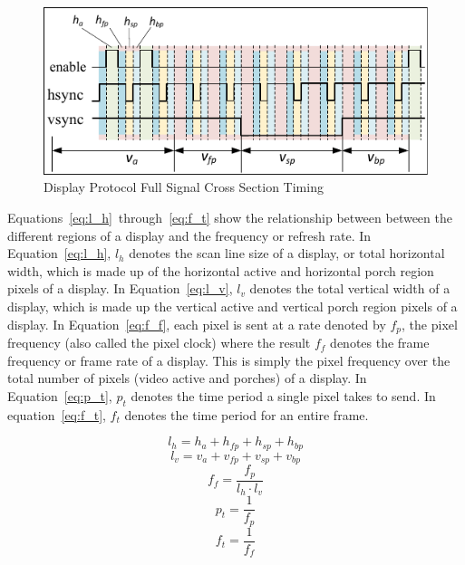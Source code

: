     \begin{figure}[H]
        \centering
        \includegraphics[width=1.0\textwidth]{fig/display_timing_full_cross.pdf}
        \caption{Display Protocol Full Signal Cross Section Timing}
        \label{fig:display_protocol_full_cross}
    \end{figure}

    Equations~\eqref{eq:l_h}~through~\eqref{eq:f_t} show the relationship between between the different regions of a display and the frequency or refresh rate. In Equation~\eqref{eq:l_h}, $l_h$ denotes the scan line size of a display, or total horizontal width, which is made up of the horizontal active and horizontal porch region pixels of a display. In Equation~\eqref{eq:l_v}, $l_v$ denotes the total vertical width of a display, which is made up the vertical active and vertical porch region pixels of a display. In Equation~\eqref{eq:f_f}, each pixel is sent at a rate denoted by $f_p$, the pixel frequency (also called the pixel clock) where the result $f_f$ denotes the frame frequency or frame rate of a display. This is simply the pixel frequency over the total number of pixels (video active and porches) of a display. In Equation~\eqref{eq:p_t}, $p_t$ denotes the time period a single pixel takes to send. In equation~\eqref{eq:f_t}, $f_t$ denotes the time period for an entire frame.


    \begin{equation}
        l_h=h_a+h_{fp}+h_{sp}+h_{bp}
        \label{eq:l_h}
    \end{equation}
    \begin{equation}
        l_v=v_a+v_{fp}+v_{sp}+v_{bp}
        \label{eq:l_v}
    \end{equation}
    \begin{equation}
        f_f={\frac{f_p}{l_h \cdot l_v}}
        \label{eq:f_f}
    \end{equation}
    \begin{equation}
        p_t={\frac{1}{f_p}}
        \label{eq:p_t}
    \end{equation}
    \begin{equation}
        f_t={\frac{1}{f_f}}
        \label{eq:f_t}
    \end{equation}

